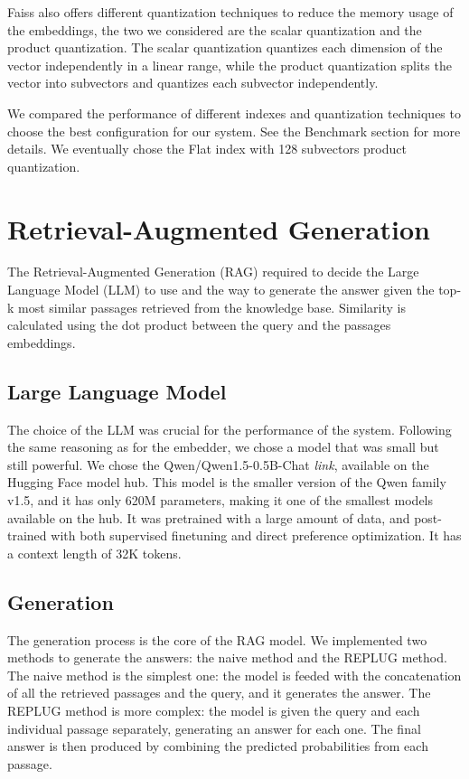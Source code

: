 \documentclass[11pt]{article}
\begin{document}
Faiss also offers different quantization techniques to reduce the memory usage of the embeddings, 
the two we considered are the scalar quantization and the product quantization. 
The scalar quantization quantizes each dimension of the vector independently in a linear
range, while the product quantization splits the vector into subvectors and quantizes each
subvector independently.

We compared the performance of different indexes and quantization techniques to choose the best
configuration for our system. See the Benchmark section for more details.
We eventually chose the Flat index with 128 subvectors product quantization.

\section{Retrieval-Augmented Generation}

The Retrieval-Augmented Generation (RAG) required to decide the Large Language Model (LLM) to use 
and the way to generate the answer given the top-k most similar passages retrieved from the knowledge base.
Similarity is calculated using the dot product between the query and the passages embeddings.

\subsection{Large Language Model}

The choice of the LLM was crucial for the performance of the system. Following the
same reasoning as for the embedder, we chose a model that was small but still powerful.
We chose the Qwen/Qwen1.5-0.5B-Chat \textit{link}, available on the Hugging Face model hub. 
This model is the smaller version of the Qwen family v1.5, and it has only 620M parameters, making
it one of the smallest models available on the hub.
It was pretrained with a large amount of data, and post-trained with both supervised finetuning 
and direct preference optimization. It has a context length of 32K tokens.

\subsection{Generation}

The generation process is the core of the RAG model. We implemented two methods to generate the
answers: the naive method and the REPLUG method.
The naive method is the simplest one: the model is feeded with the concatenation of all 
the retrieved passages and the query, and it generates the answer.
The REPLUG method is more complex: the model is given the query and each individual passage 
separately, generating an answer for each one. The final answer is then produced by 
combining the predicted probabilities from each passage.
\end{document}
